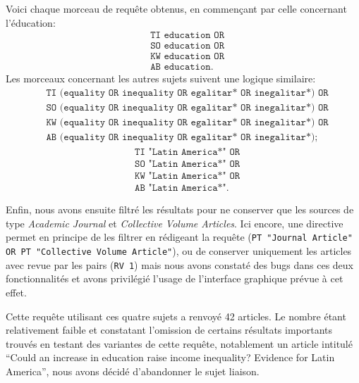 \documentclass[pagesize, twoside=off, bibliography=totoc, DIV=calc, fontsize=12pt, a4paper, french]{scrartcl}
\begin{document}
Voici chaque morceau de requête obtenus, en commençant par celle concernant l’éducation:
\begin{equation}
  \label{eq:education}
  \left.\begin{aligned}
    &\texttt{TI education OR}\\ 
    &\texttt{SO education OR}\\ 
    &\texttt{KW education OR}\\ 
    &\texttt{AB education}.
  \end{aligned}\right.
\end{equation}
Les morceaux concernant les autres sujets suivent une logique similaire:
\begin{equation}
  \label{eq:equality}
  \left.\begin{aligned}
    &\texttt{TI (equality OR inequality OR egalitar* OR inegalitar*) OR}\\ 
    &\texttt{SO (equality OR inequality OR egalitar* OR inegalitar*) OR}\\ 
    &\texttt{KW (equality OR inequality OR egalitar* OR inegalitar*) OR}\\ 
    &\texttt{AB (equality OR inequality OR egalitar* OR inegalitar*)};
  \end{aligned}\right.
\end{equation}
\begin{equation}
  \label{eq:latin}
  \left.\begin{aligned}
    &\texttt{TI "Latin America*" OR}\\ 
    &\texttt{SO "Latin America*" OR}\\ 
    &\texttt{KW "Latin America*" OR}\\ 
    &\texttt{AB "Latin America*"}.
  \end{aligned}\right.
\end{equation}

Enfin, nous avons ensuite filtré les résultats pour ne conserver que les sources de type \emph{Academic Journal} et \emph{Collective Volume Articles}. Ici encore, une directive permet en principe de les filtrer en rédigeant la requête (\texttt{PT "Journal Article" OR PT "Collective Volume Article"}), ou de conserver uniquement les articles avec revue par les pairs (\texttt{RV 1}) mais nous avons constaté des bugs dans ces deux fonctionnalités et avons privilégié l’usage de l’interface graphique prévue à cet effet.

Cette requête utilisant ces quatre sujets a renvoyé 42 articles. Le nombre étant relativement faible et constatant l’omission de certains résultats importants trouvés en testant des variantes de cette requête, notablement un article intitulé “Could an increase in education raise income inequality? Evidence for Latin America”, nous avons décidé d’abandonner le sujet \og{}liaison\fg{}.
\end{document}
